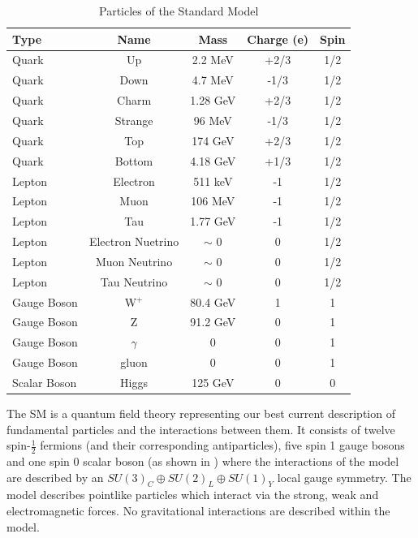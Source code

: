 \begin{table}
  \centering
  \begin{tabular}{l c c c c}
    \toprule
    Type  & Name & Mass & Charge (e) & Spin  \\
    \midrule
    Quark & Up & 2.2 MeV & +2/3 & 1/2 \\
    Quark & Down & 4.7 MeV &  -1/3 & 1/2 \\
    \midrule
    Quark & Charm & 1.28 GeV& +2/3 & 1/2 \\
    Quark & Strange & 96 MeV& -1/3 & 1/2 \\
    \midrule
    Quark & Top & 174 GeV & +2/3 & 1/2 \\
    Quark & Bottom & 4.18 GeV& +1/3 & 1/2 \\
    \midrule
    \midrule
    Lepton & Electron & 511 keV & -1 & 1/2 \\
    Lepton & Muon & 106 MeV & -1 & 1/2 \\
    Lepton & Tau & 1.77 GeV & -1 & 1/2 \\
    \midrule
    Lepton & Electron Nuetrino & $\sim$ 0 & 0 & 1/2 \\
    Lepton & Muon Neutrino & $\sim$ 0 & 0 & 1/2 \\
    Lepton & Tau Neutrino & $\sim$ 0 & 0 & 1/2 \\
    \midrule
    \midrule
    Gauge Boson & W$^+$ & 80.4 GeV& 1 & 1 \\
    Gauge Boson & Z & 91.2 GeV & 0 & 1 \\
    Gauge Boson & $\gamma$ & 0 & 0 & 1 \\
    Gauge Boson & gluon & 0 & 0 & 1 \\
    \midrule
    \midrule
    Scalar Boson & Higgs & 125 GeV& 0 & 0 \\
    \bottomrule
  \end{tabular}
  \caption[Particles of the Standard Model]{Particles of the Standard Model \cite{Patrignani:2016xqp}}
  \label{tab:smparticles}
\end{table}



The \ac{SM} is a quantum field theory representing our best current description of fundamental particles and the interactions between them. It consists of twelve spin-$\frac{1}{2}$ fermions (and their corresponding antiparticles), five spin 1 gauge bosons and one spin 0 scalar boson (as shown in ) where the interactions of the model are described by an $SU(3)_{C}\oplus SU(2)_{L}\oplus SU(1)_{Y}$ local gauge symmetry. The model describes pointlike particles which interact via the strong, weak and electromagnetic forces. No gravitational interactions are described within the model.

